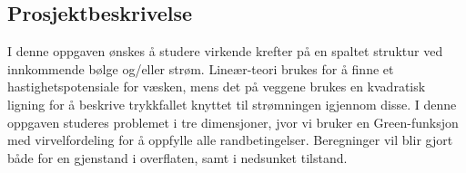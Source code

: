 \documentclass[a4paper,norsk]{article}
\begin{document}
\subsection*{Prosjektbeskrivelse}
I denne oppgaven ønskes å studere virkende krefter på en spaltet struktur ved innkommende bølge og/eller strøm. Lineær-teori brukes for å finne et hastighetspotensiale for væsken, mens det på veggene brukes en kvadratisk ligning for å beskrive trykkfallet knyttet til strømningen igjennom disse. I denne oppgaven studeres problemet i tre dimensjoner, jvor vi bruker en Green-funksjon med virvelfordeling for å oppfylle alle randbetingelser. Beregninger vil blir gjort både for en gjenstand i overflaten, samt i nedsunket tilstand.
\end{document}
